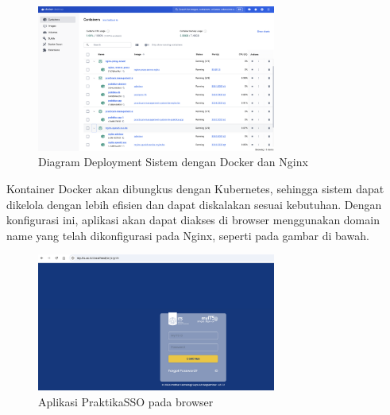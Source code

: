 \begin{figure}[h!]
  \centering
  \includegraphics[width=0.7\textwidth]{gambar/docker.png}
  \caption{Diagram Deployment Sistem dengan Docker dan Nginx}
  \label{deployment_diagram}
\end{figure}

Kontainer Docker akan dibungkus dengan Kubernetes, sehingga sistem dapat dikelola dengan lebih efisien dan dapat diskalakan sesuai kebutuhan. Dengan konfigurasi ini, aplikasi akan dapat diakses di browser menggunakan domain name yang telah dikonfigurasi pada Nginx, seperti pada gambar di bawah.

\begin{figure}[h!]
    \centering
    \includegraphics[width=0.7\textwidth]{gambar/sso.png}
    \caption{Aplikasi PraktikaSSO pada browser}
\end{figure}
